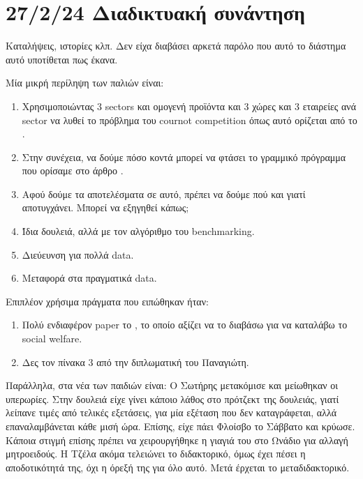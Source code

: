 \documentclass[a4paper,twoside,10pt]{article}
\begin{document}
\section{27/2/24 Διαδικτυακή συνάντηση}
Καταλήψεις, ιστορίες κλπ. Δεν είχα διαβάσει αρκετά παρόλο που αυτό το διάστημα αυτό υποτίθεται πως έκανα. 

Μία μικρή περίληψη των παλιών είναι: 
\begin{enumerate}
	\item Χρησιμοποιώντας 3 sectors και ομογενή προϊόντα και 3 χώρες και 3 εταιρείες ανά sector να λυθεί το πρόβλημα του cournot competition όπως αυτό ορίζεται από το \cite{Allocating}.
	\item Στην συνέχεια, να δούμε πόσο κοντά μπορεί να φτάσει το γραμμικό πρόγραμμα που ορίσαμε στο άρθρο \cite{First}. 
	\item Αφού δούμε τα αποτελέσματα σε αυτό, πρέπει να δούμε πού και γιατί αποτυγχάνει. Μπορεί να εξηγηθεί κάπως;
	\item Ίδια δουλειά, αλλά με τον αλγόριθμο του benchmarking. 
	\item Διεύευνση για πολλά data.
	\item Μεταφορά στα πραγματικά data. 
\end{enumerate}
Επιπλέον χρήσιμα πράγματα που ειπώθηκαν ήταν:
\begin{enumerate}
	\item Πολύ ενδιαφέρον paper το \cite{'2269'}, το οποίο αξίζει να το διαβάσω για να καταλάβω το social welfare. 
	\item Δες τον πίνακα 3 από την διπλωματική του Παναγιώτη.
\end{enumerate}
Παράλληλα, στα νέα των παιδιών είναι: Ο Σωτήρης μετακόμισε και μείωθηκαν οι υπερωρίες. Στην δουλειά είχε γίνει κάποιο λάθος στο πρότζεκτ της δουλειάς, γιατί λείπανε τιμές από τελικές εξετάσεις, για μία εξέταση που δεν καταγράφεται, αλλά επαναλαμβάνεται κάθε μισή ώρα. Επίσης, είχε πάει Φλοίσβο το Σάββατο και κρύωσε. Κάποια στιγμή επίσης πρέπει να χειρουργήθηκε η γιαγιά του στο Ωνάδιο για αλλαγή μητροειδούς. 
Η Τζέλα ακόμα τελειώνει το διδακτορικό, όμως έχει πέσει η αποδοτικότητά της, όχι η όρεξή της για όλο αυτό. Μετά έρχεται το μεταδιδακτορικό. 
\end{document}
